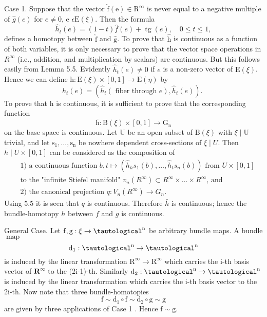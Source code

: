 \documentclass[10pt]{article}
\begin{document}
Case 1. Suppose that the vector $\hat{\mathrm{f}}(\mathrm{e}) \in \mathrm{R}^{\infty}$ is never equal to a negative multiple of $\hat{g}(e)$ for $e \neq 0$, e $\epsilon \mathrm{E}(\xi)$. Then the formula
$$
\hat{h}_{t}(e)=(1-t) \hat{f}(e)+\operatorname{tg}(e), \quad 0 \leq t \leq 1,
$$
defines a homotopy between $\hat{\mathrm{f}}$ and $\hat{\mathrm{g}}$. To prove that $\hat{\mathrm{h}}$ is continuous as a function of both variables, it is only necessary to prove that the vector space operations in $R^{\infty}$ (i.e., addition, and multiplication by scalars) are continuous. But this follows easily from Lemma 5.5. Evidently $\hat{h}_{t}(e) \neq 0$ if $e$ is a non-zero vector of $\mathrm{E}(\xi)$. Hence we can define $\mathrm{h}: \mathrm{E}(\xi) \times[0,1] \rightarrow \mathrm{E}(\eta)$ by
$$
h_{t}(e)=\left(\hat{h}_{t}(\text { fiber through } e), \hat{h}_{t}(e)\right) \text {. }
$$
To prove that $\mathrm{h}$ is continuous, it is sufficient to prove that the corresponding function
$$
\overline{\mathrm{h}}: \mathrm{B}(\xi) \times[0,1] \rightarrow \mathrm{G}_{\mathrm{n}}
$$
on the base space is continuous. Let $\mathrm{U}$ be an open subset of $\mathrm{B}(\xi)$ with $\xi \mid \mathrm{U}$ trivial, and let $\mathrm{s}_{1}, \ldots, \mathrm{s}_{\mathrm{n}}$ be nowhere dependent cross-sections of $\xi \mid U$. Then $\bar{h} \mid U \times[0,1]$ can be considered as the composition of
$$
\begin{aligned}
&\text { 1) a continuous function } b, t \mapsto\left(\hat{h}_{h} s_{1}(b), \ldots, \hat{h}_{t} s_{n}(b)\right) \text { from } U \times[0,1] \\
&\text { to the "infinite Stiefel manifold" } v_{n}\left(R^{\infty}\right) \subset R^{\infty} \times \ldots \times R^{\infty} \text {, and } \\
&\text { 2) the canonical projection } q: V_{n}\left(R^{\infty}\right) \rightarrow G_{n} \text {. }
\end{aligned}
$$
Using $5.5$ it is seen that $q$ is continuous. Therefore $\bar{h}$ is continuous; hence the bundle-homotopy $h$ between $f$ and $g$ is continuous.

General Case. Let $\mathrm{f}, \mathrm{g}: \xi \rightarrow \tautological^{\mathrm{n}}$ be arbitrary bundle maps. A bundle $\operatorname{map}$
$$
\mathrm{d}_{1}: \tautological^{\mathrm{n}} \rightarrow \tautological^{\mathrm{n}}
$$
is induced by the linear transformation $\mathrm{R}^{\infty} \rightarrow \mathrm{R}^{\infty}$ which carries the $\mathrm{i}$-th basis vector of $\mathbf{R}^{\infty}$ to the (2i-1)-th. Similarly $\mathrm{d}_{2}: \tautological^{\mathrm{n}} \rightarrow \tautological^{\mathrm{n}}$ is induced by the linear transformation which carries the i-th basis vector to the 2i-th. Now note that three bundle-homotopies
$$
\mathrm{f} \sim \mathrm{d}_{1} \circ \mathrm{f} \sim \mathrm{d}_{2} \circ \mathrm{g} \sim \mathrm{g}
$$
are given by three applications of Case 1 . Hence $\mathrm{f} \sim \mathrm{g}$.
\end{document}
